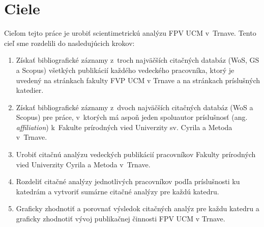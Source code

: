 \chapter{Ciele}

Cieľom tejto práce je urobiť scientimetrickú analýzu FPV UCM v~Trnave.  Tento
cieľ sme rozdelili do nasledujúcich krokov:

\begin{enumerate}
	\item Získať bibliografické záznamy z~troch najväčších citačných databáz
		(WoS, GS a Scopus) všetkých publikácií každého vedeckého pracovníka, ktorý
		je uvedený na stránkach fakulty FVP UCM v Trnave a na stránkach príslušných
		katedier.
	\item Získať bibliografické záznamy z~dvoch najväčších citačných databáz (WoS
		a Scopus) pre práce, v~ktorých má aspoň jeden spoluautor príslušnosť
		(ang.\,\emph{affiliation}) k~Fakulte prírodných vied Univerzity sv. Cyrila
		a Metoda v~Trnave.
	\item Urobiť citačnú analýzu vedeckých publikácií pracovníkov
		Fakulty prírodných vied Univerzity Cyrila a Metoda v~Trnave.
	\item Rozdeliť citačné analýzy jednotlivých pracovníkov podľa príslušnosti ku
		katedrám a vytvoriť sumárne citačné analýzy pre každú katedru.
	\item Graficky zhodnotiť a porovnať výsledok citačných analýz pre každu
		katedru a graficky zhodnotiť vývoj publikačnej činnosti FPV UCM v Trnave.
\end{enumerate}


